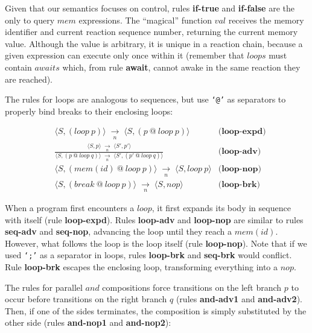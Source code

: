 \documentclass{sigplanconf}
\newcommand{\code}[1] {{\small{\texttt{#1}}}}
\newcommand{\ST}{\1\xrightarrow[~n~]{}\1}
\newcommand{\LL}{\langle}
\newcommand{\RR}{\rangle}
\newcommand{\DS}{\displaystyle}
\newcommand{\1}{\;}
\newcommand{\2}{\;\;}
\newcommand{\3}{\;\;\;}
\newcommand{\5}{\;\;\;\;\;}
\begin{document}
Given that our semantics focuses on control, rules \textbf{if-true} and 
\textbf{if-false} are the only to query $mem$ expressions.
%
The ``magical'' function $val$ receives the memory identifier and current 
reaction sequence number, returning the current memory value.
%
Although the value is arbitrary, it is unique in a reaction chain, because a 
given expression can execute only once within it (remember that $loops$ must 
contain $awaits$ which, from rule \textbf{await}, cannot awake in the same 
reaction they are reached).

The rules for loops are analogous to sequences, but use \code{`@'} as 
separators to properly bind breaks to their enclosing loops:

{ \setlength{\jot}{20pt}
\begin{eqnarray*}
& \LL S, (loop~p) \RR \ST \LL S, (p~@~loop~p) \RR
    & \textbf{(loop-expd)}       \\
& \frac
    {\DS \LL S,p \RR \ST \LL S',p' \RR }
    {\DS \LL S, (p~@~loop~q) \RR \ST \LL S', (p'~@~loop~q) \RR }
    & \textbf{(loop-adv)}    \\
& \LL S, (mem(id)~@~loop~p) \RR \ST \LL S, loop~p \RR
    & \textbf{(loop-nop)}    \\
& \LL S, (break~@~loop~p) \RR \ST \LL S, nop \RR
    & \textbf{(loop-brk)}
\end{eqnarray*}
}

When a program first encounters a $loop$, it first expands its body in sequence 
with itself (rule \textbf{loop-expd}).
Rules \textbf{loop-adv} and \textbf{loop-nop} are similar to rules 
\textbf{seq-adv} and \textbf{seq-nop}, advancing the loop until they reach a 
$mem(id)$.
However, what follows the loop is the loop itself (rule \textbf{loop-nop}).
Note that if we used \code{`;'} as a separator in loops, rules 
\textbf{loop-brk} and \textbf{seq-brk} would conflict.
%
Rule \textbf{loop-brk} escapes the enclosing loop, transforming everything into 
a $nop$.

The rules for parallel $and$ compositions force transitions on the left branch 
$p$ to occur before transitions on the right branch $q$ (rules 
\textbf{and-adv1} and \textbf{and-adv2}).
Then, if one of the sides terminates, the composition is simply substituted by 
the other side (rules \textbf{and-nop1} and \textbf{and-nop2}):
\end{document}
